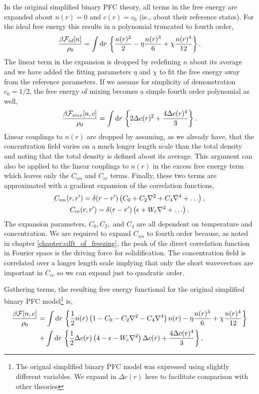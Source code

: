 In the original simplified binary PFC theory, all terms in the free energy are
expanded about $n(r) = 0$ and $c(r) = c_0$ (ie., about their reference states).
For the ideal free energy this results in a polynomial truncated to fourth
order,
%
\begin{equation}
    \label{ideal_expansion}
    \frac{\beta\mathcal{F}_{id}[n]}{\rho_0} = \int \mathrm{d}r\,
    \left\lbrace \frac{n(r)^2}{2} - \eta\frac{n(r)^3}{6} + \chi\frac{n(r)^4}{12} \right\rbrace.
\end{equation}
%
The linear term in the expansion is dropped by redefining $n$ about its average
and we have added the fitting parameters $\eta$ and $\chi$ to fit the free
energy away from the reference parameters. If we assume for simplicity of
demonstration $c_0 = 1/2$, the free energy of mixing becomes a simple fourth
order polynomial as well,
%
\begin{equation}
    \frac{\beta\mathcal{F}_{mix}[n, c]}{\rho_0} = \int \mathrm{d}r\, \left\lbrace
       2\Delta c(r)^2 + \frac{4\Delta c(r)^4}{3}
    \right\rbrace.
\end{equation}
%
Linear couplings to $n(r)$ are dropped by assuming, as we already have, that
the concentration field varies on a much longer length scale than the total
density and noting that the total density is defined about its average. This
argument can also be applied to the linear couplings to $n(r)$ in the excess free
energy term which leaves only the $C_{nn}$ and $C_{cc}$ terms. Finally, these
two terms are approximated with a gradient expansion of the correlation
functions,
%
\begin{gather}
    C_{nn}(r, r^\prime) = \d(r - r^\prime)\l(
        C_0 + C_2 \nabla^2 + C_4 \nabla^4 + \dots\r), \\
    C_{cc}(r, r^\prime) = \d(r - r^\prime)\l(
        \epsilon + W_c \nabla^2 + \dots\r).
\end{gather}
%
The expansion parameters, $C_0, C_2,$ and $C_4$ are all dependent on
temperature and concentration. We are required to expand $C_{nn}$ to fourth
order because, as noted in chapter \ref{chapter:cdft_of_freezing}, the peak of
the direct correlation function in Fourier space is the driving force for
solidification.  The concentration field is correlated over a longer length
scale implying that only the short wavevectors are important in $C_{cc}$ so we
can expand just to quadratic order.

Gathering terms, the resulting free energy functional for the original simplified
binary PFC model\footnote{The orignal simplified binary PFC model was
expressed using slightly different variables. We expand in $\Delta c(r)$ here to 
facilitate comparison with other theories} is,
%
\begin{align}
    \frac{\beta\mathcal{F}[n, c]}{\rho_0} &= \int \mathrm{d}r\, \left\lbrace 
        \frac{1}{2} n(r) \left( 1 - C_0 - C_2 \nabla^2 - C_4\nabla^4 \right) n(r)
      - \eta\frac{n(r)^3}{6} + \chi\frac{n(r)^4}{12} \right\rbrace \\
    &+ \int \mathrm{d}r\, \left\lbrace
        \frac{1}{2} \Delta c(r) \left( 4 - \epsilon - W_c\nabla^2 \right) \Delta c(r) 
      + \frac{4 \Delta c(r)^4}{3} \right\rbrace. \nonumber
\end{align}
%

